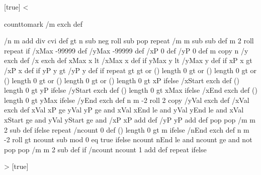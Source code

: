 %
\newif\ifPst@ChangeOrder
{}[true]{}
<{%
  counttomark /m exch def
  \ifPst@ChangeOrder
    /m0 m def
    m \psk@plotNoMax\space 1 add div 1 sub cvi {
      m0 \psk@plotNoMax\space 1 add roll /m0 m0 \psk@plotNoMax\space 1 add sub def
    } repeat
  \fi
  /n m \psk@plotNoMax{} add div cvi def
  \psk@plotNoMax{} gt {%
    n {
      \psk@plotNoMax\space \psk@plotNo{} sub neg roll %
      \psk@plotNoMax{} sub { pop } repeat %
      /m m \psk@plotNoMax{} sub sub def
      m 2 roll
    } repeat
  } if %
  /xMax -99999 def /yMax -99999 def
  /xP 0 def /yP 0 def
  m copy
  n {
    /y exch def /x exch def
    xMax x lt { /xMax x def } if
    yMax y lt {/yMax y def } if
    xP x gt { /xP x def } if
    yP y gt { /yP y def } if
  } repeat
  \psk@xStep{} gt \psk@yStep{} gt or (\psk@xStart) length 0 gt or
  (\psk@yStart) length 0 gt or (\psk@xEnd) length 0 gt or (\psk@yEnd) length 0 gt or {
%
    (\psk@xStart) length 0 gt {\psk@xStart\space }{ xP } ifelse /xStart exch def
    (\psk@yStart) length 0 gt {\psk@yStart\space }{ yP } ifelse /yStart exch def
    (\psk@xEnd) length 0 gt { \psk@xEnd\space }{ xMax } ifelse /xEnd exch def
    (\psk@yEnd) length 0 gt { \psk@yEnd\space }{ yMax } ifelse /yEnd exch def
    n {
      m -2 roll
      2 copy /yVal exch def /xVal exch def
      xVal xP ge
      yVal yP ge and
      xVal xEnd le and
      yVal yEnd le and
      xVal xStart ge and
      yVal yStart ge and {
        /xP xP \psk@xStep\space add def
        /yP yP \psk@yStep\space add def
      }{%
        pop pop
        /m m 2 sub def
      } ifelse
    } repeat
  }{%
    /ncount 0 def
    (\psk@nEnd) length 0 gt { \psk@nEnd\space }{ m } ifelse 
    /nEnd exch def
    n {
      m -2 roll
      \psk@nStep{} gt {
        ncount \psk@nStart\space sub \psk@nStep\space mod 0 eq }{ true } ifelse
        ncount nEnd le and
        ncount \psk@nStart\space ge and not {
          pop pop
          /m m 2 sub def
        } if
        /ncount ncount 1 add def
      } repeat
  } ifelse
}>
%
%
%
\newdimen\psk@llx
\newdimen\psk@lly
\newdimen\psk@urx
\newdimen\psk@ury
{}
\newif\ifPst@plot@box
{}[true]{}

